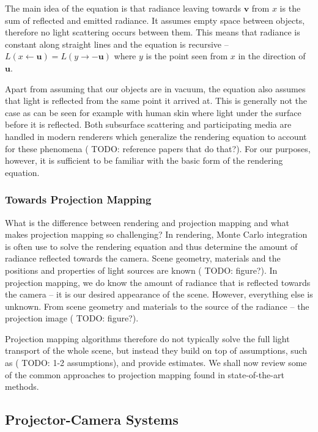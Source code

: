 The main idea of the equation is that radiance leaving towards \(\mathbf{v}\) from \(x\) is the sum of reflected and emitted radiance. It assumes empty space between objects, therefore no light scattering occurs between them. This means that radiance is constant along straight lines and the equation is recursive -- \(L(x \leftarrow \mathbf{u}) = L(y \rightarrow -\mathbf{u})\) where \(y\) is the point seen from \(x\) in the direction of \(\mathbf{u}\).

Apart from assuming that our objects are in vacuum, the equation also assumes that light is reflected from the same point it arrived at. This is generally not the case as can be seen for example with human skin where light under the surface before it is reflected. Both subsurface scattering and participating media are handled in modern renderers which generalize the rendering equation to account for these phenomena ({\color{red} TODO: reference papers that do that?}). For our purposes, however, it is sufficient to be familiar with the basic form of the rendering equation.

\subsubsection{Towards Projection Mapping}
\label{section:background-projection_mapping-light_transport-towards_projection_mapping}

What is the difference between rendering and projection mapping and what makes projection mapping so challenging? In rendering, Monte Carlo integration is often use to solve the rendering equation and thus determine the amount of radiance reflected towards the camera. Scene geometry, materials and the positions and properties of light sources are known ({\color{red} TODO: figure?}). In projection mapping, we do know the amount of radiance that is reflected towards the camera -- it is our desired appearance of the scene. However, everything else is unknown. From scene geometry and materials to the source of the radiance -- the projection image ({\color{red} TODO: figure?}).

Projection mapping algorithms therefore do not typically solve the full light transport of the whole scene, but instead they build on top of assumptions, such as ({\color{red} TODO: 1-2 assumptions}), and provide estimates. We shall now review some of the common approaches to projection mapping found in state-of-the-art methods.

\subsection{Projector-Camera Systems}
\label{section:background-projection_mapping-procams}

